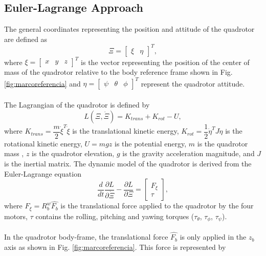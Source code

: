 \subsection{Euler-Lagrange Approach}
The general coordinates representing the position and attitude of the quadrotor are defined as
\begin{equation}
	\Xi=\begin{bmatrix}
	\xi & \eta
	\end{bmatrix}^{T},
	\label{ec:coorgenerales}
\end{equation}
where $\xi=\begin{bmatrix}
x & y & z
\end{bmatrix}^{T}$ is the vector representing the position of the center of mass of the quadrotor relative to the body reference frame shown in Fig. \ref{fig:marcoreferencia} and $\eta=\begin{bmatrix}
\psi & \theta & \phi
\end{bmatrix}^{T}$ represent the quadrotor attitude.
\\\\
The Lagrangian of the quadrotor is defined by
\begin{equation}
	L(\Xi,\dot{\Xi})=K_{trans}+K_{rot} - U,	
	\label{ec:lagrangiano}
\end{equation}
where $ K_{trans} = \dfrac{m}{2}\dot{\xi}^{T}\dot{\xi} $ is the translational kinetic energy, $ K_{rot} = \dfrac{1}{2}\dot{\eta}^{T}J\dot{\eta} $ is the rotational kinetic energy, $ U=mgz $ is the potential energy, $m$ is the quadrotor mass , $z$ is the quadrotor elevation, $g$ is the gravity acceleration magnitude, and $J$ is the inertial matrix. The dynamic model of the quadrotor is derived from the Euler-Lagrange equation
\begin{equation}
	\dfrac{d}{dt}\dfrac{\partial L}{\partial \dot{\Xi}}-\dfrac{\partial L}{\partial \Xi}=
	\begin{bmatrix}
	F_{\xi}\\
	\tau
	\end{bmatrix},
	\label{ec:eulerlag}
 \end{equation} 
where $F_{\xi}=R_{b}^{w}\hat{F_{b}}$ is the translational force applied to the quadrotor by the four motors, $\tau$ contains the rolling, pitching and yawing torques ($\tau_\theta$, $\tau_\phi$, $\tau_\psi$).
\\\\
In the quadrotor body-frame, the translational force $\hat{F_{b}}$ is only applied in the $z_{b}$ axis as shown in Fig. \ref{fig:marcoreferencia}. This force is represented by
